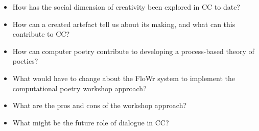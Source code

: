 \begin{itemize}[label=--,itemsep=0pt]
\item How has the social dimension of creativity been explored in CC to date? 
\item How can a created artefact tell us about its making, and what can this contribute to CC?
\item How can computer poetry contribute to developing a process-based theory of poetics? 
\item What would have to change about the FloWr system to implement the computational poetry workshop approach?
\item What are the pros and cons of the workshop approach?
\item What might be the future role of dialogue in CC?
\end{itemize}


